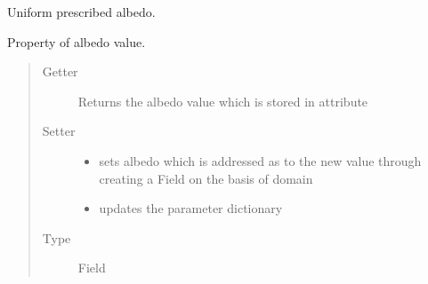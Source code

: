 \documentclass[letterpaper,10pt,english]{sphinxmanual}
\begin{document}
\begin{fulllineitems}
\begin{quote}
\begin{description}
\begin{itemize}
\end{itemize}

\end{description}\end{quote}

Uniform prescribed albedo.

\begin{fulllineitems}
\label{api/climlab.surface:climlab.surface.albedo.ConstantAlbedo.albedo}
Property of albedo value.
\begin{quote}\begin{description}
\item[{Getter}] \leavevmode
Returns the albedo value which is stored in attribute 

\item[{Setter}] \leavevmode\begin{itemize}
\item {} 
sets albedo which is addressed as  to the new value
through creating a Field on the basis of domain 

\item {} 
updates the parameter dictionary 

\end{itemize}

\item[{Type}] \leavevmode
Field

\end{description}\end{quote}

\end{fulllineitems}


\end{fulllineitems}

\end{document}
